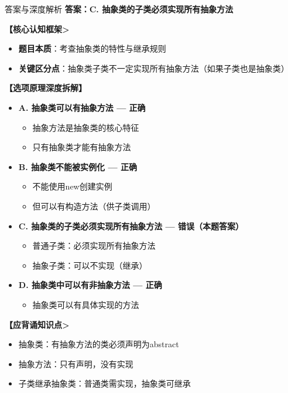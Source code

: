 \documentclass[12pt, a4paper]{ctexart}
\begin{document}
\begin{enumerate}[label=\textbf{\arabic*.}]
	      \begin{bluebox}{答案与深度解析}
		      \textbf{答案：C. 抽象类的子类必须实现所有抽象方法}

		      \textbf{【核心认知框架>}
		      \begin{itemize}[leftmargin=*, nosep, label={}]
			      \item \textbf{题目本质}：考查抽象类的特性与继承规则
			      \item \textbf{关键区分点}：抽象类子类不一定实现所有抽象方法（如果子类也是抽象类）
		      \end{itemize}

		      \textbf{【选项原理深度拆解】}
		      \begin{itemize}[label={}, nosep]
			      \item \textbf{A. 抽象类可以有抽象方法 — 正确}
			      \begin{itemize}[label={}, nosep]
				      \item 抽象方法是抽象类的核心特征
				      \item 只有抽象类才能有抽象方法
			      \end{itemize}
			      \item \textbf{B. 抽象类不能被实例化 — 正确}
			      \begin{itemize}[label={}, nosep]
				      \item 不能使用new创建实例
				      \item 但可以有构造方法（供子类调用）
			      \end{itemize}
			      \item \textbf{C. 抽象类的子类必须实现所有抽象方法 — 错误（本题答案）}
			      \begin{itemize}[label={}, nosep]
				      \item 普通子类：必须实现所有抽象方法
				      \item 抽象子类：可以不实现（继承）
			      \end{itemize}
			      \item \textbf{D. 抽象类中可以有非抽象方法 — 正确}
			      \begin{itemize}[label={}, nosep]
				      \item 抽象类可以有具体实现的方法
			      \end{itemize}
		      \end{itemize}

		      \textbf{【应背诵知识点>}
		      \begin{itemize}[label={}, nosep]
			      \item 抽象类：有抽象方法的类必须声明为abstract
			      \item 抽象方法：只有声明，没有实现
			      \item 子类继承抽象类：普通类需实现，抽象类可继承
		      \end{itemize}
	      \end{bluebox}


\end{enumerate}
\end{document}
